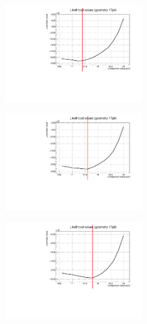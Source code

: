 \documentclass[a4paper, 11pt]{report}
\begin{document}
\begin{figure}[htbp]
\begin{minipage}[b]{.32\textwidth}
\includegraphics[width=6cm, height=4.6cm]{figs/likelihood100HighStat/likelihood17p4.pdf}
\end{minipage}\hfill
\begin{minipage}[b]{.32\textwidth}
\includegraphics[width=6cm, height=4.6cm]{figs/likelihood100HighStat/likelihood17p6.pdf}
\end{minipage} \hfill
\begin{minipage}[b]{.32\textwidth}
\includegraphics[width=6cm, height=4.6cm]{figs/likelihood100HighStat/likelihood17p8.pdf}
\end{minipage} \hfill \vspace{10pt}


\end{figure}
\end{document}
